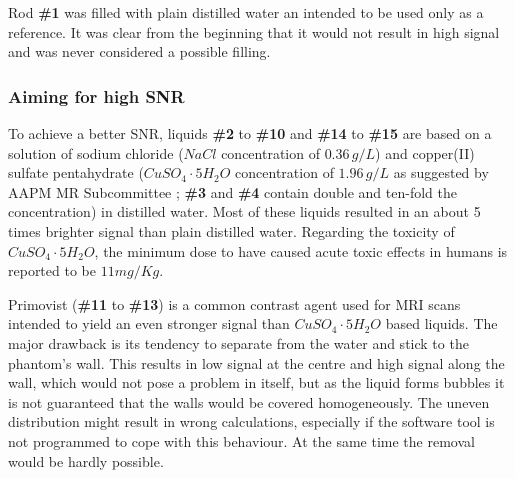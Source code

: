 \vspace{1cm}

Rod \textbf{\#1} was filled with plain distilled water an intended to be used only as a reference.
It was clear from the beginning that it would not result in high signal and was never considered a possible filling.

\subsubsection{Aiming for high SNR}
To achieve a better SNR, liquids \textbf{\#2} to \textbf{\#10} and \textbf{\#14} to \textbf{\#15} are based on a solution of sodium chloride ($NaCl$ concentration of $0.36 \, g/L$) and copper(II) sulfate pentahydrate ($CuSO_4\cdot5H_2O$ concentration of $1.96 \, g/L$ as suggested by AAPM MR Subcommittee \cite{Jackson2009};  \textbf{\#3} and \textbf{\#4} contain double and ten-fold the concentration) in distilled water.
Most of these liquids resulted in an about 5 times brighter signal than plain distilled water.
Regarding the toxicity of $CuSO_4\cdot5H_2O$, the minimum dose to have caused acute toxic effects in humans is reported to be $11 mg/Kg$.

\vspace{1cm}

Primovist (\textbf{\#11} to \textbf{\#13}) is a common contrast agent used for MRI scans \cite{VanBeers2012, Rohrer, primovist} intended to yield an even stronger signal than $CuSO_4\cdot5H_2O$ based liquids.
The major drawback is its tendency to separate from the water and stick to the phantom's wall.
This results in low signal at the centre and high signal along the wall, which would not pose a problem in itself, but as the liquid forms bubbles it is not guaranteed that the walls would be covered homogeneously.
The uneven distribution might result in wrong calculations, especially if the software tool is not programmed to cope with this behaviour.
At the same time the removal would be hardly possible.

